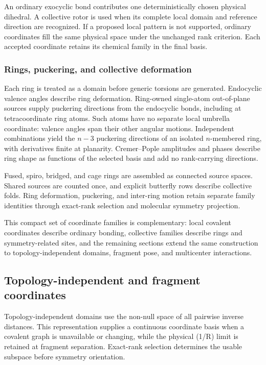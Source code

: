 \documentclass[journal=jctcce,manuscript=article,layout=traditional]{achemso}
\theoremstyle{definition}
\begin{document}
{An ordinary exocyclic bond contributes one deterministically chosen physical
dihedral. A collective rotor is used when its complete local domain and
reference direction are recognized. If a proposed local pattern is not
supported, ordinary coordinates fill the same physical space under the
unchanged rank criterion. Each accepted coordinate retains its chemical
family in the final basis.}

\subsubsection{Rings, puckering, and collective deformation}
\label{sec:ring-coordinates}

{Each ring is treated as a domain before generic torsions are generated.
Endocyclic valence angles describe ring deformation. Ring-owned
single-atom out-of-plane sources supply puckering directions from the
endocyclic bonds, including at tetracoordinate ring atoms. Such atoms have no
separate local umbrella coordinate: valence angles span their other angular
motions. Independent combinations yield the \(n-3\) puckering directions
of an isolated \(n\)-membered ring, with derivatives finite at planarity. Cremer--Pople amplitudes and phases describe
ring shape as functions of the selected basis and add no rank-carrying
directions.\cite{CremerPople1975,RingPuckering2021,LemaSaavedraFernandezRamos2026RingCP}}

{Fused, spiro, bridged, and cage rings are assembled as connected source
spaces. Shared sources are counted once, and explicit butterfly rows describe
collective folds. Ring deformation, puckering, and inter-ring motion retain
separate family identities through exact-rank selection and molecular
symmetry projection.}

This compact set of coordinate families is complementary: local covalent
coordinates describe ordinary bonding, collective families describe rings and
symmetry-related sites, and the remaining sections extend the same construction
to topology-independent domains, fragment pose, and multicenter interactions.
\subsection{Topology-independent and fragment coordinates}

Topology-independent domains use the non-null space of all pairwise inverse
distances.\cite{BakerPulay1996Inverse,Maslen2005Scaled}  This representation supplies a continuous {coordinate basis} when a covalent
graph is unavailable or changing, while the physical (1/R) limit is retained
at fragment separation.  Exact-rank selection determines the usable subspace
before symmetry orientation.
\end{document}
